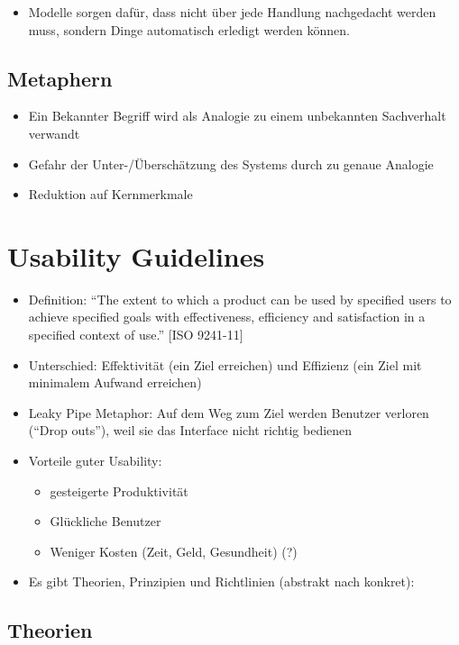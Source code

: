 \begin{itemize}
\item
  Modelle sorgen dafür, dass nicht über jede Handlung nachgedacht werden
  muss, sondern Dinge automatisch erledigt werden können.
\end{itemize}

\subsection{Metaphern}

\begin{itemize}
\item
  Ein Bekannter Begriff wird als Analogie zu einem unbekannten
  Sachverhalt verwandt
\item
  Gefahr der Unter-/Überschätzung des Systems durch zu genaue Analogie
\item
  Reduktion auf Kernmerkmale
\end{itemize}

\section{Usability Guidelines}

\begin{itemize}
\item
  Definition: ``The extent to which a product can be used by specified
  users to achieve specified goals with effectiveness, efficiency and
  satisfaction in a specified context of use.'' {[}ISO 9241-11{]}
\item
  Unterschied: Effektivität (ein Ziel erreichen) und Effizienz (ein Ziel
  mit minimalem Aufwand erreichen)
\item
  Leaky Pipe Metaphor: Auf dem Weg zum Ziel werden Benutzer verloren
  (``Drop outs''), weil sie das Interface nicht richtig bedienen
\item
  Vorteile guter Usability:

  \begin{itemize}
  \item
    gesteigerte Produktivität
  \item
    Glückliche Benutzer
  \item
    Weniger Kosten (Zeit, Geld, Gesundheit) (?)
  \end{itemize}
\item
  Es gibt Theorien, Prinzipien und Richtlinien (abstrakt nach konkret):
\end{itemize}

\subsection{Theorien}

